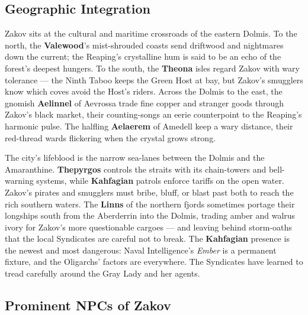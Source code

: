 \subsection*{Geographic Integration}

Zakov sits at the cultural and maritime crossroads of the eastern Dolmis. To the north, the \textbf{Valewood}'s mist-shrouded coasts send driftwood and nightmares down the current; the Reaping's crystalline hum is said to be an echo of the forest's deepest hungers. To the south, the \textbf{Theona} isles regard Zakov with wary tolerance --- the Ninth Taboo keeps the Green Host at bay, but Zakov's smugglers know which coves avoid the Host's riders. Across the Dolmis to the east, the gnomish \textbf{Aelinnel} of Aevrossa trade fine copper and stranger goods through Zakov's black market, their counting-songs an eerie counterpoint to the Reaping's harmonic pulse. The halfling \textbf{Aelaerem} of Amedell keep a wary distance, their red-thread wards flickering when the crystal grows strong.

The city's lifeblood is the narrow sea-lanes between the Dolmis and the Amaranthine. \textbf{Thepyrgos} controls the straits with its chain-towers and bell-warning systems, while \textbf{Kahfagian} patrols enforce tariffs on the open water. Zakov's pirates and smugglers must bribe, bluff, or blast past both to reach the rich southern waters. The \textbf{Linns} of the northern fjords sometimes portage their longships south from the Aberderrin into the Dolmis, trading amber and walrus ivory for Zakov's more questionable cargoes --- and leaving behind storm-oaths that the local Syndicates are careful not to break. The \textbf{Kahfagian} presence is the newest and most dangerous: Naval Intelligence's \textit{Ember} is a permanent fixture, and the Oligarchs' factors are everywhere. The Syndicates have learned to tread carefully around the Gray Lady and her agents.

\subsection*{Prominent NPCs of Zakov}
\label{sec:zakov-npcs}

